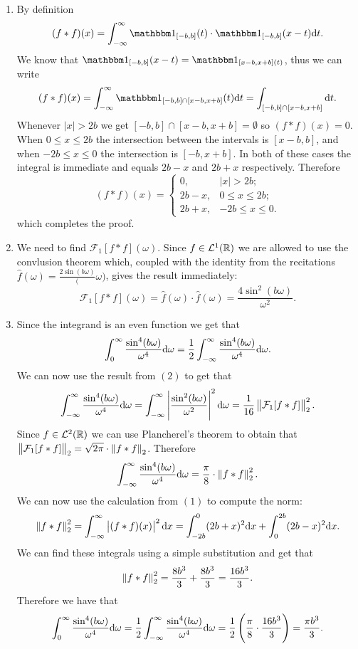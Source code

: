 \documentclass[11pt,a4paper]{article}
\begin{document}
\begin{solution} \phantom{}
\begin{enumerate}
  \item[(1)] By definition
    \[
      (f * f)(x) =
      \int_{-\infty}^{\infty} \ind_{[-b,b]} (t) \cdot \ind_{[-b,b]} (x - t) \dt.
    \]
    We know that $\ind_{[-b,b]} (x - t) = \ind_{[x-b,x+b](t)}$,
    thus we can write
    \[
      (f * f)(x) =
      \int_{-\infty}^{\infty} \ind_{[-b,b] \cap [x-b,x+b]} (t) \dt =
      \int_{[-b,b] \cap [x-b,x+b]} \dt.
    \]
    Whenever $|x| > 2b$ we get $[-b,b] \cap [x-b,x+b] = \emptyset$
    so $(f * f)(x) = 0$.
    When $0 \le x \le 2b$ the intersection between the intervals
    is $[x - b, b]$, and when $-2b \le x \le 0$ the intersection is
    $[-b, x + b]$.
    In both of these cases the integral is immediate and equals
    $2b - x$ and $2b + x$ respectively.
    Therefore
    \[
        (f * f)(x) =
        \begin{cases}
          0, &|x| > 2b; \\
          2b - x, &0 \le x \le 2b; \\
          2b + x, &-2b \le x \le 0.
        \end{cases}
      \]
    which completes the proof.
  \item[(2)] We need to find $\mathcal F_1[f * f](\omega)$.
    Since $f \in \mathcal L^1(\mathbb{R})$ we are allowed to use the convlusion
    theorem which, coupled with the identity
    from the recitations $\hat{f}(\omega) = \frac{2 \sin(b \omega)}(\omega)$,
    gives the result immediately:
    \[
      \mathcal F_1[f * f](\omega) =
      \hat{f}(\omega) \cdot \hat{f}(\omega) =
      \frac{4 \sin^2(b \omega)}{\omega^2}.
    \]
  \item[(3)] Since the integrand is an even function we get that
    \[
      \int_{0}^{\infty} \frac{\sin^4(b \omega)}{\omega^4} \mathrm{d} \omega =
      \frac{1}{2} \int_{-\infty}^{\infty} \frac{\sin^4(b \omega)}{\omega^4} \mathrm{d} \omega.
    \]
    We can now use the result from $(2)$ to get that
    \[
      \int_{-\infty}^{\infty} \frac{\sin^4(b \omega)}{\omega^4} \mathrm{d} \omega =
      \int_{-\infty}^{\infty} \left\lvert\frac{\sin^2(b \omega)}{\omega^2}\right\rvert^2 \mathrm{d} \omega =
      \frac{1}{16} \left\lVert\mathcal F_1[f * f]\right\rVert_2^2.
    \]
    Since $f \in \mathcal L^2(\mathbb{R})$ we can use Plancherel's theorem
    to obtain
    that
    $\left\lVert\mathcal F_1[f * f]\right\rVert_2 = \sqrt{2 \pi} \cdot \left\lVert f * f\right\rVert_2$.
    Therefore
    \[
      \int_{-\infty}^{\infty} \frac{\sin^4(b \omega)}{\omega^4} \mathrm{d} \omega =
      \frac{\pi}{8} \cdot \left\lVert f * f\right\rVert_2^2.
    \]
    We can now use the calculation from $(1)$ to compute the norm:
    \[
      \norm{f * f}_2^2 =
      \int_{-\infty}^{\infty} \abs{(f * f)(x)}^2 \dx = 
      \int_{-2b}^{0} (2b + x)^2 \dx +
      \int_{0}^{2b} (2b - x)^2 \dx.
    \]
    We can find these integrals using a simple substitution and get that
    \[
      \left\lVert f * f\right\rVert_2^2 =
      \frac{8b^3}{3} + \frac{8b^3}{3} =
      \frac{16b^3}{3}.
    \]
    Therefore we have that
    \[
      \int_{0}^{\infty} \frac{\sin^4(b \omega)}{\omega^4} \domega =
      \half \int_{-\infty}^{\infty} \frac{\sin^4(b \omega)}{\omega^4} \domega =
      \half \del{\frac{\pi}{8} \cdot \frac{16b^3}{3}} =
      \frac{\pi b^3}{3}.
    \]
  \end{enumerate}
\end{solution}
\end{document}
